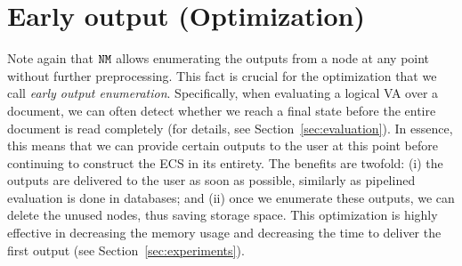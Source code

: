 \section{Early output (Optimization)} 

Note again that $\mathtt{NM}$ allows enumerating the outputs from a node at any point without further preprocessing. This fact is crucial for the optimization that we call \emph{early output enumeration}. Specifically, when evaluating a logical VA over a document, we can often detect whether we reach a final state before the entire document is read completely (for details, see Section~\ref{sec:evaluation}). In essence, this means that we can provide certain outputs to the user at this point before continuing to construct the ECS in its entirety. The benefits are twofold: (i) the outputs are delivered to the user as soon as possible, similarly as pipelined evaluation is done in databases; and (ii) once we enumerate these outputs, we can delete the unused nodes, thus saving storage space. This optimization is highly effective in decreasing the memory usage and decreasing the time to deliver the first output (see Section~\ref{sec:experiments}). %




%
%



